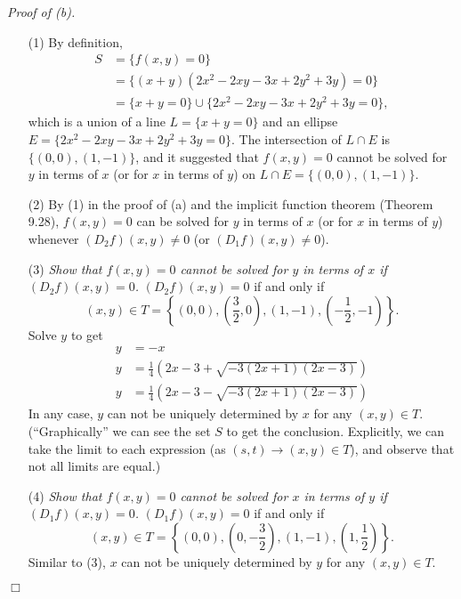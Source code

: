 \documentclass{article}
\begin{document}
\emph{Proof of (b).}
\begin{enumerate}
\item[(1)]
  By definition,
  \begin{align*}
    S
    &= \{ f(x,y) = 0 \} \\
    &= \{ (x+y)(2x^2-2xy-3x+2y^2+3y) = 0 \} \\
    &= \{ x+y = 0 \} \cup \{ 2x^2-2xy-3x+2y^2+3y = 0 \},
  \end{align*}
  which is a union of a line $L = \{ x+y = 0 \}$
  and an ellipse $E = \{ 2x^2-2xy-3x+2y^2+3y = 0 \}$.
  The intersection of $L \cap E$ is $\{ (0,0), (1,-1) \}$,
  and it suggested that $f(x,y) = 0$ cannot be solved for $y$ in terms of $x$
  (or for $x$ in terms of $y$) on $L \cap E = \{ (0,0), (1,-1) \}$.

\item[(2)]
  By (1) in the proof of (a) and the implicit function theorem (Theorem 9.28),
  $f(x,y) = 0$ can be solved for $y$ in terms of $x$ (or for $x$ in terms of $y$)
  whenever $(D_2 f)(x,y) \neq 0$ (or $(D_1 f)(x,y) \neq 0$).

\item[(3)]
  \emph{Show that $f(x,y) = 0$ cannot be solved for $y$ in terms of $x$
  if $(D_2 f)(x,y) = 0$.}
  $(D_2 f)(x,y) = 0$ if and only if
  \[
    (x,y) \in T = \left\{
      (0,0),
      \left(\frac{3}{2},0\right),
      (1,-1),
      \left(-\frac{1}{2}, -1\right)
    \right\}.
  \]
  Solve $y$ to get
  \begin{align*}
    y &= -x \\
    y &= \frac{1}{4}\left( 2x-3 + \sqrt{-3(2x+1)(2x-3)} \right) \\
    y &= \frac{1}{4}\left( 2x-3 - \sqrt{-3(2x+1)(2x-3)} \right)
  \end{align*}
  In any case, $y$ can not be uniquely determined by $x$ for any $(x,y) \in T$.
  (``Graphically'' we can see the set $S$ to get the conclusion.
  Explicitly, we can take the limit to each expression
  (as $(s,t) \to (x,y) \in T$), and observe that not all limits are equal.)

\item[(4)]
  \emph{Show that $f(x,y) = 0$ cannot be solved for $x$ in terms of $y$
  if $(D_1 f)(x,y) = 0$.}
  $(D_1 f)(x,y) = 0$ if and only if
  \[
    (x,y) \in T = \left\{
      (0,0),
      \left(0,-\frac{3}{2}\right),
      (1,-1),
      \left(1,\frac{1}{2}\right)
    \right\}.
  \]
  Similar to (3),
  $x$ can not be uniquely determined by $y$ for any $(x,y) \in T$.
\end{enumerate}
$\Box$ \\
\end{document}
